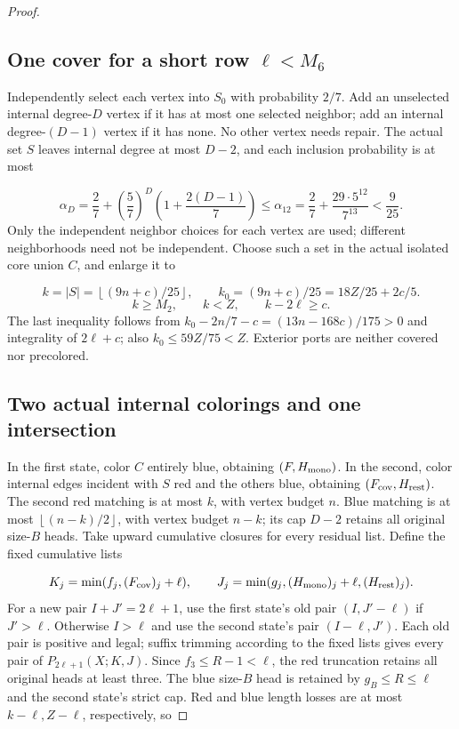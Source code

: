 \documentclass[11pt,a4paper]{article}
\newcommand{\floor}[1]{\left\lfloor#1\right\rfloor}
\theoremstyle{definition}
\begin{document}
\begin{proof}
\subsection*{One cover for a short row $\ell<M_6$}
Independently select each vertex into $S_0$ with probability $2/7$.
Add an unselected internal degree-$D$ vertex if it has at most one selected neighbor;
add an internal degree-$(D-1)$ vertex if it has none.
No other vertex needs repair.
The actual set $S$ leaves internal degree at most $D-2$,
and each inclusion probability is at most

\[
\alpha_D=\frac27+\left(\frac57\right)^D
\left(1+\frac{2(D-1)}7\right)
\le\alpha_{12}=\frac27+\frac{29\cdot5^{12}}{7^{13}}<\frac9{25}.
\]
Only the independent neighbor choices for each vertex are used;
different neighborhoods need not be independent.
Choose such a set in the actual isolated core union $C$, and enlarge it to

\[
k=|S|=\floor{(9n+c)/25},\qquad k_0=(9n+c)/25=18Z/25+2c/5.
\]
\[
k\ge M_2,\qquad k<Z,\qquad k-2\ell\ge c.
\]
The last inequality follows from
$k_0-2n/7-c=(13n-168c)/175>0$ and integrality of $2\ell+c$;
also $k_0\le59Z/75<Z$.
Exterior ports are neither covered nor precolored.

\subsection*{Two actual internal colorings and one intersection}
In the first state, color $C$ entirely blue, obtaining $(F,H_{\rm mono})$.
In the second, color internal edges incident with $S$ red and the others blue,
obtaining $(F_{\rm cov},H_{\rm rest})$.
The second red matching is at most $k$, with vertex budget $n$.
Blue matching is at most $\floor{(n-k)/2}$, with vertex budget $n-k$;
its cap $D-2$ retains all original size-$B$ heads.
Take upward cumulative closures for every residual list.
Define the fixed cumulative lists

\[
K_j=\min(f_j,(F_{\rm cov})_j+\ell),\qquad
J_j=\min(g_j,(H_{\rm mono})_j+\ell,(H_{\rm rest})_j).
\]
For a new pair $I+J'=2\ell+1$, use the first state's old pair
$(I,J'-\ell)$ if $J'>\ell$.
Otherwise $I>\ell$ and use the second state's pair $(I-\ell,J')$.
Each old pair is positive and legal; suffix trimming according to the fixed lists
gives every pair of $P_{2\ell+1}(X;K,J)$.
Since $f_3\le R-1<\ell$, the red truncation retains all original heads at least three.
The blue size-$B$ head is retained by $g_B\le R\le\ell$ and the second state's strict cap.
Red and blue length losses are at most $k-\ell,Z-\ell$, respectively, so


\end{proof}
\end{document}
